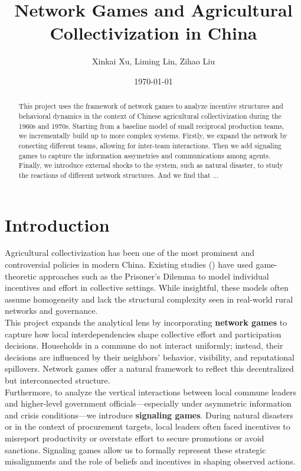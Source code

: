 \documentclass[12pt]{article}
\title{Network Games and Agricultural Collectivization in China}
\author{Xinkai Xu, Liming Lin, Zihao Liu}
\date{\today}
\begin{document}
\maketitle
\onehalfspacing

\begin{abstract}
This project uses the framework of network games to analyze incentive structures and behavioral dynamics in the context of Chinese agricultural collectivization during the 1960s and 1970s. Starting from a baseline model of small reciprocal production teams, we incrementally build up to more complex systems. Firstly, we expand the network by conecting different teams, allowing for inter-team interactions. Then we add signaling games to capture the information assymetries and communications among agents. Finally, we introduce external shocks to the system, such as natural disaster, to study the reactions of different network structures. And we find that ...
\end{abstract}

\section{Introduction}

Agricultural collectivization has been one of the most prominent and controversial policies in modern China. Existing studies (\cite{chinnDiligenceLazinessChinese1980, nitzanDiligenceLazinessChinese1987}) have used game-theoretic approaches such as the Prisoner’s Dilemma to model individual incentives and effort in collective settings. While insightful, these models often assume homogeneity and lack the structural complexity seen in real-world rural networks and governance.\\

This project expands the analytical lens by incorporating \textbf{network games} to capture how local interdependencies shape collective effort and participation decisions. Households in a commune do not interact uniformly; instead, their decisions are influenced by their neighbors' behavior, visibility, and reputational spillovers. Network games offer a natural framework to reflect this decentralized but interconnected structure.\\

Furthermore, to analyze the vertical interactions between local commune leaders and higher-level government officials—especially under asymmetric information and crisis conditions—we introduce \textbf{signaling games}. During natural disasters or in the context of procurement targets, local leaders often faced incentives to misreport productivity or overstate effort to secure promotions or avoid sanctions. Signaling games allow us to formally represent these strategic misalignments and the role of beliefs and incentives in shaping observed actions.\\
\end{document}
